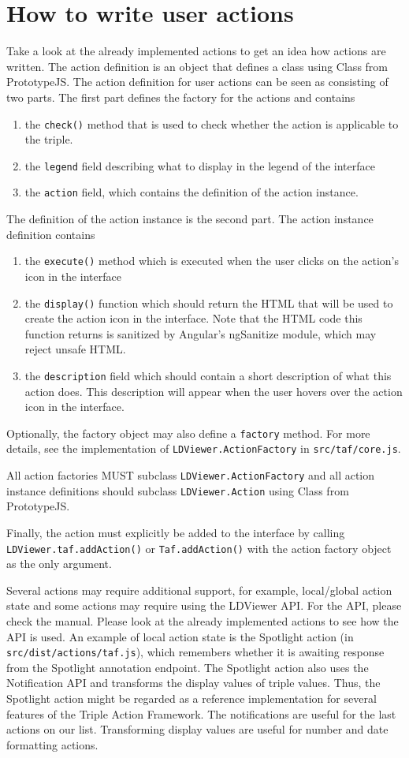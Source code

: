 \documentclass{article}
\begin{document}
\section{How to write user actions}
Take a look at the already implemented actions to get an idea how actions are written.
The action definition is an object that defines a class using Class from PrototypeJS.
The action definition for user actions can be seen as consisting of two parts. The first part defines the factory for the actions and contains 
\begin{enumerate}
\item the \texttt{check()} method that is used to check whether the action is applicable to the triple.
\item the \texttt{legend} field describing what to display in the legend of the interface
\item the \texttt{action} field, which contains the definition of the action instance.
\end{enumerate}
The definition of the action instance is the second part.
The action instance definition contains 
\begin{enumerate}
\item the \texttt{execute()} method which is executed when the user clicks on the action's icon in the interface
\item the \texttt{display()} function which should return the HTML that will be used to create the action icon in the interface. Note that the HTML code this function returns is sanitized by Angular's ngSanitize module, which may reject unsafe HTML.
\item the \texttt{description} field which should contain a short description of what this action does. This description will appear when the user hovers over the action icon in the interface.
\end{enumerate}
Optionally, the factory object may also define a \texttt{factory} method.
For more details, see the implementation of \texttt{LDViewer.ActionFactory} in \texttt{src/taf/core.js}.

All action factories MUST subclass \texttt{LDViewer.ActionFactory} and all action instance definitions should subclass \texttt{LDViewer.Action} using Class from PrototypeJS.

Finally, the action must explicitly be added to the interface by calling \texttt{LDViewer.taf.addAction()} or \texttt{Taf.addAction()} with the action factory object as the only argument.

Several actions may require additional support, for example, local/global action state and some actions may require using the LDViewer API.
For the API, please check the manual.
Please look at the already implemented actions to see how the API is used.
An example of local action state is the Spotlight action (in \texttt{src/dist/actions/taf.js}), which remembers whether it is awaiting response from the Spotlight annotation endpoint.
The Spotlight action also uses the Notification API and transforms the display values of triple values.
Thus, the Spotlight action might be regarded as a reference implementation for several features of the Triple Action Framework.
The notifications are useful for the last actions on our list.
Transforming display values are useful for number and date formatting actions.
\end{document}
